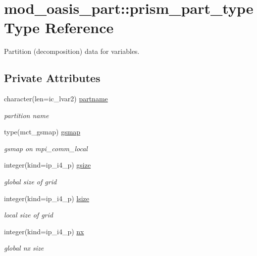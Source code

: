 \hypertarget{structmod__oasis__part_1_1prism__part__type}{}\section{mod\+\_\+oasis\+\_\+part\+:\+:prism\+\_\+part\+\_\+type Type Reference}
\label{structmod__oasis__part_1_1prism__part__type}


Partition (decomposition) data for variables.  


\subsection*{Private Attributes}
\begin{DoxyCompactItemize}
\item 
character(len=ic\+\_\+lvar2) \hyperlink{structmod__oasis__part_1_1prism__part__type_ae53180c23d73bf1f4930e24171dba0a2}{partname}
\begin{DoxyCompactList}\small\item\em partition name \end{DoxyCompactList}\item 
type(mct\+\_\+gsmap) \hyperlink{structmod__oasis__part_1_1prism__part__type_a3d605216cf9bdf556416419ee8ec5993}{gsmap}
\begin{DoxyCompactList}\small\item\em gsmap on mpi\+\_\+comm\+\_\+local \end{DoxyCompactList}\item 
integer(kind=ip\+\_\+i4\+\_\+p) \hyperlink{structmod__oasis__part_1_1prism__part__type_aaa2c19e53815eaf5df431612eadabfa4}{gsize}
\begin{DoxyCompactList}\small\item\em global size of grid \end{DoxyCompactList}\item 
integer(kind=ip\+\_\+i4\+\_\+p) \hyperlink{structmod__oasis__part_1_1prism__part__type_a7d857ca94b6eef3642bb6fd1ffeff551}{lsize}
\begin{DoxyCompactList}\small\item\em local size of grid \end{DoxyCompactList}\item 
integer(kind=ip\+\_\+i4\+\_\+p) \hyperlink{structmod__oasis__part_1_1prism__part__type_a7640ce8e1943f2fc70c8b072795502b2}{nx}
\begin{DoxyCompactList}\small\item\em global nx size \end{DoxyCompactList}\item 

\end{DoxyCompactItemize}
